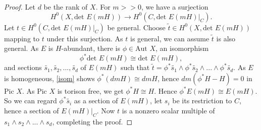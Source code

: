 \documentclass[10pt,a4paper]{amsart}
\begin{document}
\begin{proof}
    Let $d$ be the rank of $X$. For $m>>0$, we have a surjection 
    $$H^0(X,\textrm{det }E(mH))\to H^0(C,\textrm{det }E(mH)|_C).$$ Let
    $t\in H^0(C,\textrm{det }E(mH)|_C)$ be general. Choose $\tilde{t}\in 
    H^0(X,\textrm{det }E(mH)) $ mapping to $t$ under this surjection. As
    $t$ is general, we can assume $\tilde{t}$ is also general. As $E$ is
    $H$-abundant, there is $\phi\in \textrm{Aut }X$, an isomorphism
    \begin{equation}\label{isom}
        \phi^*\textrm{det }E(mH)\cong \textrm{det }E(mH),
    \end{equation}
and sections $\tilde{s_1},\tilde{s_2},...,\tilde{s_d}$ of $E(mH)$ 
    such that $\tilde{t}=\phi^*\tilde{s_1}\wedge 
    \phi^*\tilde{s_2}\wedge...\wedge \phi^*\tilde{s_d}$. As $E$ is
    homogeneous, \eqref{isom} shows $\phi^*(dmH)\cong dmH$, hence
    $dm(\phi^*H-H)=0$ in $\textrm{Pic }X$. As $\textrm{Pic }X$ is
    torison free, we get $\phi^*H\cong H$. Hence $\phi^*E(mH)\cong 
    E(mH)$. So we can regard $\phi^*\tilde{s_i}$ as a section of $
    E(mH)$, let $s_i$ be its restriction to $C$, hence a section of
    $E(mH)|_C$. Now $t$ is a nonzero scalar multiple of $s_1\wedge 
    s_2\wedge ...\wedge s_d$, completing the proof.
\end{proof}
\end{document}
